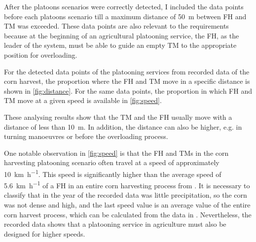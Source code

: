 \documentclass[]{nsm-thesis}
\begin{document}
After the platoons scenarios were correctly detected, I included the data points before each platoons scenario till a maximum distance of \SI{50}{\metre} between \ac{FH} and \ac{TM} was exceeded. These data points are also relevant to the requirements because at the beginning of an agricultural platooning service, the \ac{FH}, as the leader of the system, must be able to guide an empty \ac{TM} to the appropriate position for overloading.

For the detected data points of the platooning services from recorded data of the corn harvest, the proportion where the \ac{FH} and \ac{TM} move in a specific distance is shown in \autoref{fig:distance}. For the same data points, the proportion in which \ac{FH} and \ac{TM} move at a given speed is available in \autoref{fig:speed}.

These analysing results show that the \ac{TM} and the \ac{FH} usually move with a distance of less than \SI{10}{\metre}. In addition, the distance can also be higher, e.g. in turning manoeuvres or before the overloading process.

One notable observation in \autoref{fig:speed} is that the \ac{FH} and \ac{TM}s in the corn harvesting platooning scenario often travel at a speed of approximately \SI{10}{\kilo\metre\per\hour}. This speed is significantly higher than the average speed of \SI{5.6}{\kilo\metre\per\hour} of a \ac{FH} in an entire corn harvesting process from \cite{faustzahlen2018}. It is necessary to classify that in the year of the recorded data was little precipitation, so the corn was not dense and high, and the last speed value is an average value of the entire corn harvest process, which can be calculated from the data in \cite{faustzahlen2018}.
Nevertheless, the recorded data shows that a platooning service in agriculture must also be designed for higher speeds. 
\end{document}
